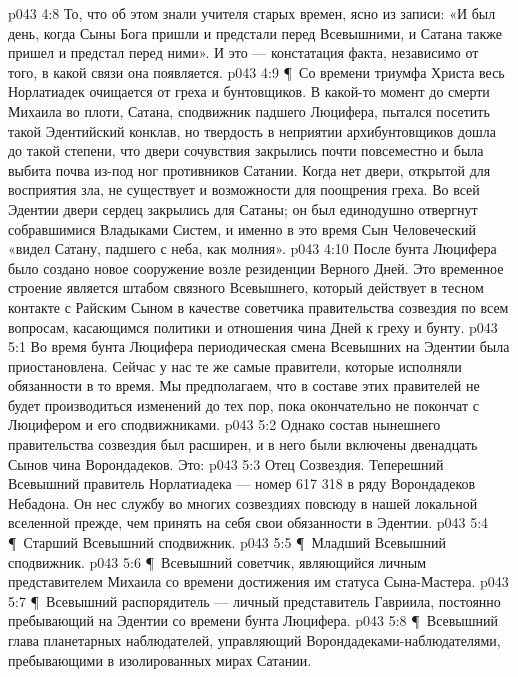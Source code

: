 \vs p043 4:8 То, что об этом знали учителя старых времен, ясно из записи: «И был день, когда Сыны Бога пришли и предстали перед Всевышними, и Сатана также пришел и предстал перед ними». И это --- констатация факта, независимо от того, в какой связи она появляется.
\vs p043 4:9 \P\ Со времени триумфа Христа весь Норлатиадек очищается от греха и бунтовщиков. В какой\hyp{}то момент до смерти Михаила во плоти, Сатана, сподвижник падшего Люцифера, пытался посетить такой Эдентийский конклав, но твердость в неприятии архибунтовщиков дошла до такой степени, что двери сочувствия закрылись почти повсеместно и была выбита почва из\hyp{}под ног противников Сатании. Когда нет двери, открытой для восприятия зла, не существует и возможности для поощрения греха. Во всей Эдентии двери сердец закрылись для Сатаны; он был единодушно отвергнут собравшимися Владыками Систем, и именно в это время Сын Человеческий «видел Сатану, падшего с неба, как молния».
\vs p043 4:10 После бунта Люцифера было создано новое сооружение возле резиденции Верного Дней. Это временное строение является штабом связного Всевышнего, который действует в тесном контакте с Райским Сыном в качестве советчика правительства созвездия по всем вопросам, касающимся политики и отношения чина Дней к греху и бунту.
\vs p043 5:1 Во время бунта Люцифера периодическая смена Всевышних на Эдентии была приостановлена. Сейчас у нас те же самые правители, которые исполняли обязанности в то время. Мы предполагаем, что в составе этих правителей не будет производиться изменений до тех пор, пока окончательно не покончат с Люцифером и его сподвижниками.
\vs p043 5:2 Однако состав нынешнего правительства созвездия был расширен, и в него были включены двенадцать Сынов чина Ворондадеков. Это:
\vs p043 5:3 \bibnobreakspace Отец Созвездия. Теперешний Всевышний правитель Норлатиадека --- номер 617 318 в ряду Ворондадеков Небадона. Он нес службу во многих созвездиях повсюду в нашей локальной вселенной прежде, чем принять на себя свои обязанности в Эдентии.
\vs p043 5:4 \P\ \bibnobreakspace Старший Всевышний сподвижник.
\vs p043 5:5 \P\ \bibnobreakspace Младший Всевышний сподвижник.
\vs p043 5:6 \P\ \bibnobreakspace Всевышний советчик, являющийся личным представителем Михаила со времени достижения им статуса Сына\hyp{}Мастера.
\vs p043 5:7 \P\ \bibnobreakspace Всевышний распорядитель --- личный представитель Гавриила, постоянно пребывающий на Эдентии со времени бунта Люцифера.
\vs p043 5:8 \P\ \bibnobreakspace Всевышний глава планетарных наблюдателей, управляющий Ворондадеками\hyp{}наблюдателями, пребывающими в изолированных мирах Сатании.
